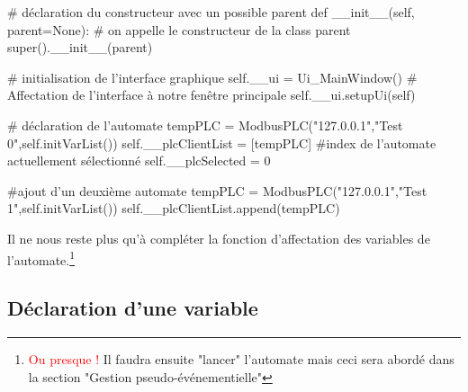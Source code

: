 \documentclass[12pt]{report}    %
\begin{document}
\begin{pyCode}

	# déclaration du constructeur avec un possible parent
	def __init__(self, parent=None):
		# on appelle le constructeur de la class parent
		super().__init__(parent)

		# initialisation de l’interface graphique
		self.__ui = Ui_MainWindow()
		# Affectation de l’interface à notre fenêtre principale
		self.__ui.setupUi(self)

		# déclaration de l’automate
		tempPLC = ModbusPLC("127.0.0.1","Test 0",self.initVarList())
		self.__plcClientList = [tempPLC]
		#index de l'automate actuellement sélectionné
		self.__plcSelected = 0

		#ajout d'un deuxième automate
		tempPLC = ModbusPLC("127.0.0.1","Test 1",self.initVarList())
		self.__plcClientList.append(tempPLC)
\end{pyCode}

Il ne nous reste plus qu'à compléter la fonction d'affectation des variables de l'automate.\footnote{\textcolor{red}{Ou presque !} Il faudra ensuite "lancer" l'automate mais ceci sera abordé dans la section "Gestion pseudo-événementielle"}


\subsection{Déclaration d'une variable}
\end{document}
